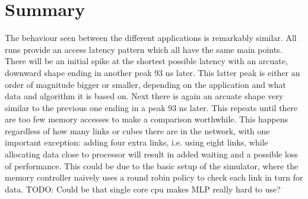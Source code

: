 

\section{Summary}
The behaviour seen between the different applications is remarkably similar. All runs provide an access latency pattern which all have the same main points. There will be an initial spike at the shortest possible latency with an arcuate, downward shape ending in another peak 93 ns later. This latter peak is either an order of magnitude bigger or smaller, depending on the application and what data and algorithm it is based on. Next there is again an arcuate shape very similar to the previous one ending in a peak 93 ns later. This repeats until there are too few memory accesses to make a comparison worthwhile. This happens regardless of how many links or cubes there are in the network, with one important exception: adding four extra links, i.e. using eight links, while allocating data close to processor will result in added waiting and a possible loss of performance. This could be due to the basic setup of the simulator, where the memory controller naively uses a round robin policy to check each link in turn for data. TODO: Could be that single core cpu makes MLP really hard to use?
\bigskip

